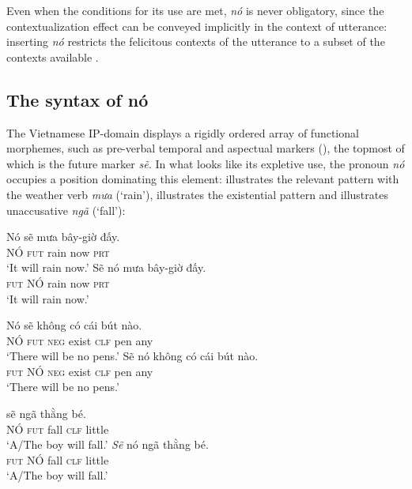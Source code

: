 \documentclass[output=paper]{LSP/langsci}
\begin{document}
Even when the conditions for its use are met, \textit{nó} is never obligatory, since the contextualization effect can be conveyed implicitly in the context of utterance: inserting \textit{nó} restricts the felicitous contexts of the utterance to a subset of the contexts available .

\subsection{The syntax of nó}

The Vietnamese IP-domain displays a rigidly ordered array of functional morphemes, such as pre-verbal temporal and aspectual markers (\citealt{Duffield2013,Phan2013}), the topmost of which is the future marker \textit{sẽ.} In what looks like its expletive use, the pronoun \textit{nó} occupies a position dominating this element:  illustrates the relevant pattern with the weather verb \textit{mưa} (‘rain’),  illustrates the existential pattern and  illustrates unaccusative \textit{ngã} (‘fall’):

\ea%
    \label{ex:Greco:18}
	\ea
    \gll Nó  sẽ  mưa  bây-giờ  đấy.\\
	NÓ  \textsc{fut}  rain  now           \textsc{prt}\\
    \glt ‘It will rain now.’
	\ex
	\gll *Sẽ  nó  mưa  bây-giờ  đấy.\\
		\textsc{fut}  NÓ  rain  now    \textsc{prt}\\
	\glt ‘It will rain now.’
\z
\z

\ea%
    \label{ex:Greco:19}
    \ea
    \gll Nó  sẽ  không  có  cái  bút  nào.\\
	NÓ  \textsc{fut}  \textsc{neg}  exist  \textsc{clf}  pen  any\\
    \glt    ‘There will be no pens.’
    \ex
 	\gll  *Sẽ  nó  không  có  cái  bút  nào. \\
      \textsc{fut}  NÓ  \textsc{neg}  exist  \textsc{clf}  pen  any\\
    \glt       ‘There will be no pens.’
    \z
\z

\ea%
    \label{ex:Greco:20}
\ea
     {sẽ}   ngã  thằng    bé.\\
     NÓ  \textsc{fut}  fall  \textsc{clf}    little	\\
    \glt      ‘A/The boy will fall.’
\ex \gll  *\textit{Sẽ} nó  ngã  thằng    bé.\\
      \textsc{fut}  NÓ  fall  \textsc{clf}    little\\
    \glt       ‘A/The boy will fall.’
       \z
 \z
\end{document}
